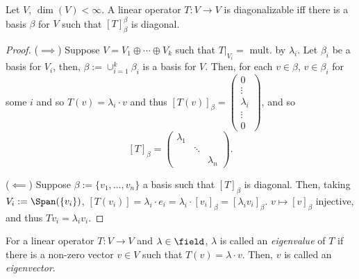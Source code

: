 \begin{proposition}\label{prop:diagonaliffbasis}
    Let $V$, $\dim(V) < \infty$. A linear operator $T : V \to V$ is diagonalizable iff there is a basis $\beta$ for $V$ such that $[T]_\beta^\beta$ is diagonal.
\end{proposition}

\begin{proof}
    ($\implies$) Suppose $V = V_1 \oplus \cdots \oplus V_k$ such that $T\vert_{V_i} = $ mult. by $\lambda_i$. Let $\beta_i$ be a basis for $V_i$, then, $\beta := \cup_{i=1}^k \beta_i$ is a basis for $V$. Then, for each $v \in \beta$, $v \in \beta_i$ for some $i$ and so $T(v) = \lambda_i \cdot v$ and thus $[T(v)]_\beta = \begin{pmatrix}
        0 \\
        \vdots\\
        \lambda_i\\
        \vdots\\
        0
    \end{pmatrix}$, and so \[
    [T]_\beta = \begin{pmatrix}
        \lambda_1&  & \\
        & \ddots & \\
        & & \lambda_n
    \end{pmatrix}.
    \]

    ($\impliedby$) Suppose $\beta := \{v_1, \dots, v_n\}$ a basis such that $[T]_\beta$ is diagonal. Then, taking $V_i := \Span (\{v_i\})$, $[T(v_i)] = \lambda_i \cdot e_i = \lambda_i \cdot [v_i]_\beta = [\lambda_i v_i]_\beta$. $v \mapsto [v]_\beta$ injective, and thus $T v_i = \lambda_i v_i$.
\end{proof}

\begin{definition}
    For a linear operator $T : V \to V$ and $\lambda \in \field$, $\lambda$ is called an \emph{eigenvalue} of $T$ if there is a non-zero vector $v \in V$ such that $T(v) = \lambda \cdot v$. Then, $v$ is called an \emph{eigenvector}.
\end{definition}